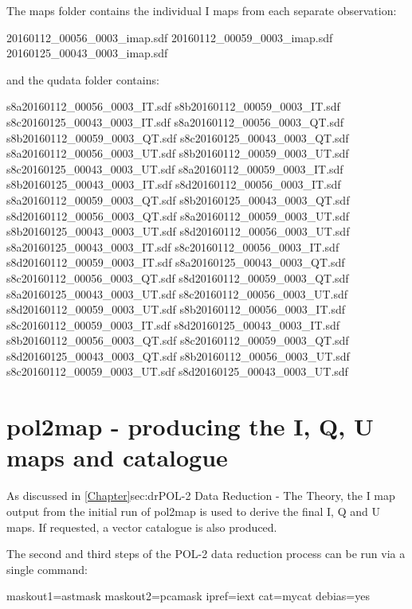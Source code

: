 The maps folder contains the individual I maps from each separate
observation:

\begin{terminalv}
20160112_00056_0003_imap.sdf  20160112_00059_0003_imap.sdf  20160125_00043_0003_imap.sdf
\end{terminalv}

and the qudata folder contains:

\begin{terminalv}
s8a20160112_00056_0003_IT.sdf  s8b20160112_00059_0003_IT.sdf  s8c20160125_00043_0003_IT.sdf
s8a20160112_00056_0003_QT.sdf  s8b20160112_00059_0003_QT.sdf  s8c20160125_00043_0003_QT.sdf
s8a20160112_00056_0003_UT.sdf  s8b20160112_00059_0003_UT.sdf  s8c20160125_00043_0003_UT.sdf
s8a20160112_00059_0003_IT.sdf  s8b20160125_00043_0003_IT.sdf  s8d20160112_00056_0003_IT.sdf
s8a20160112_00059_0003_QT.sdf  s8b20160125_00043_0003_QT.sdf  s8d20160112_00056_0003_QT.sdf
s8a20160112_00059_0003_UT.sdf  s8b20160125_00043_0003_UT.sdf  s8d20160112_00056_0003_UT.sdf
s8a20160125_00043_0003_IT.sdf  s8c20160112_00056_0003_IT.sdf  s8d20160112_00059_0003_IT.sdf
s8a20160125_00043_0003_QT.sdf  s8c20160112_00056_0003_QT.sdf  s8d20160112_00059_0003_QT.sdf
s8a20160125_00043_0003_UT.sdf  s8c20160112_00056_0003_UT.sdf  s8d20160112_00059_0003_UT.sdf
s8b20160112_00056_0003_IT.sdf  s8c20160112_00059_0003_IT.sdf  s8d20160125_00043_0003_IT.sdf
s8b20160112_00056_0003_QT.sdf  s8c20160112_00059_0003_QT.sdf  s8d20160125_00043_0003_QT.sdf
s8b20160112_00056_0003_UT.sdf  s8c20160112_00059_0003_UT.sdf  s8d20160125_00043_0003_UT.sdf
\end{terminalv}


\section{pol2map - producing the I, Q, U maps and catalogue}


As discussed in \cref{Chapter}{sec:dr}{POL-2 Data Reduction - The
  Theory}, the I map output from the initial run of pol2map is used to
derive the final I, Q and U maps. If requested, a vector catalogue is
also produced.

The second and third steps of the POL-2 data reduction process can be
run via a single command:

\begin{terminalv}
          maskout1=astmask maskout2=pcamask ipref=iext cat=mycat debias=yes
\end{terminalv}

